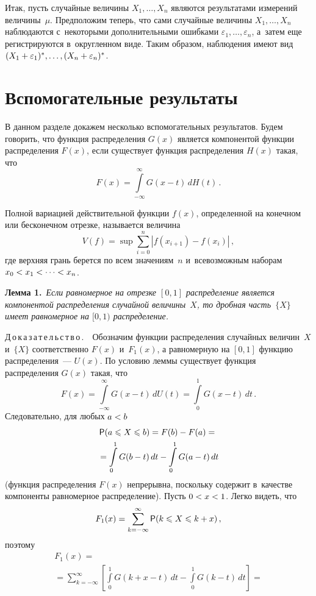 \begin{multicols}{2}
Итак,  пусть случайные величины $X_1,\ldots,X_n$ являются результатами 
измерений величины~$\mu$. Предположим теперь, что сами случайные величины 
$X_1,\ldots,X_n$
наблюдаются с~некоторыми дополнительными ошибками $\varepsilon_1,\ldots,\varepsilon_n$, 
а~затем еще регистрируются
в~округленном виде. Таким образом, наблюдения имеют вид 
$(X_1\hm+\varepsilon_1)^\ast,\ldots,(X_n+\varepsilon_n)^\ast$.


\section{Вспомогательные результаты}

В данном разделе докажем несколько вспомогательных результатов.
Будем говорить, что функция распределения $G(x)$ является компонентой
функции распределения $F(x)$, если существует функция распределения $H(x)$
такая, что
$$
F(x)=\int\limits_{-\infty}^\infty G(x-t)\,dH(t)\,.
$$

Полной вариацией действительной функции $f(x)$, определенной на конечном или
бесконечном отрезке, называется величина
$$
{V}(f)=\sup\sum\limits_{i=0}^n|f(x_{i+1})-f(x_i)|\,,
$$
где верхняя грань берется по всем значениям~$n$ и~всевозможным наборам
$x_0\hm<x_1<\cdots<x_n$.

\smallskip

\noindent
\textbf{Лемма 1.}\ \textit{Если равномерное на отрезке $[0,1]$ распределение является
компонентой распределения случайной величины~$X$, то дробная часть~$\{X\}$
имеет равномерное на $[0,1)$ распределение.}

\smallskip

\noindent
Д\,о\,к\,а\,з\,а\,т\,е\,л\,ь\,с\,т\,в\,о\,.\ \
 Обозначим функции распределения случайных величин~$X$
и~$\{X\}$ соответственно $F(x)$ и~$F_1(x)$, а равномерную на $[0,1]$ функцию
распределения~--- $U(x)$.
По условию леммы существует функция распределения $G(x)$ такая, что
$$
F(x)=\int\limits_{-\infty}^\infty G(x-t)\,dU(t)=\int\limits_0^1G(x-t)\,dt\,.
$$
Следовательно, для любых $a\hm<b$
\begin{multline*}
{\sf P}(a\leqslant X\leqslant b)=F(b)-F(a)={}\\
{}=\int\limits_0^1G(b-t)\,dt-\int\limits_0^1G(a-t)\,dt
\end{multline*}
(функция распределения $F(x)$ непрерывна, поскольку содержит в~качестве
компоненты равномерное распределение). Пусть $0\hm<x\hm<1$. Легко видеть, что
$$
F_1(x)=\sum\limits_{k=-\infty}^\infty {\sf P}(k\leqslant X\leqslant k+x)\,,
$$
поэтому
\begin{multline*}
F_1(x)= {}\\
{}=\sum\limits_{k=-\infty}^\infty \left[
\int\limits_0^1G(k+x-t)\,dt-\int\limits_0^1G(k-t)\,dt
\right]={}
\end{multline*}


\end{multicols}
